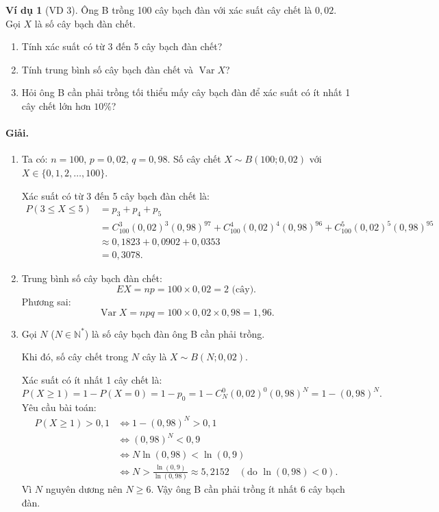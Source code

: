 \documentclass[12pt,a4paper]{article}
\theoremstyle{definition}
\newtheorem{vidu}{Ví dụ}[section]
\begin{document}
\begin{vidu}[VD 3]
Ông B trồng 100 cây bạch đàn với xác suất cây chết là $0{,}02$. Gọi $X$ là số cây bạch đàn chết.
\begin{enumerate}[label=\arabic*)]
    \item Tính xác suất có từ 3 đến 5 cây bạch đàn chết?
    \item Tính trung bình số cây bạch đàn chết và $\operatorname{Var} X$?
    \item Hỏi ông B cần phải trồng tối thiểu mấy cây bạch đàn để xác suất có ít nhất 1 cây chết lớn hơn $10\%$?
\end{enumerate}

\paragraph{Giải.}
\begin{enumerate}[label=\arabic*)]
    \item Ta có: $n = 100$, $p = 0{,}02$, $q = 0{,}98$. Số cây chết $X \sim B(100; 0{,}02)$ với $X \in \{0, 1, 2, \dots, 100\}$.
    
    Xác suất có từ 3 đến 5 cây bạch đàn chết là:
    \begin{align*}
    P(3 \le X \le 5) &= p_3 + p_4 + p_5 \\
    &= C_{100}^3 (0{,}02)^3 (0{,}98)^{97} + C_{100}^4 (0{,}02)^4 (0{,}98)^{96} + C_{100}^5 (0{,}02)^5 (0{,}98)^{95} \\
    &\approx 0{,}1823 + 0{,}0902 + 0{,}0353 \\
    &= 0{,}3078.
    \end{align*}

    \item Trung bình số cây bạch đàn chết:
    \[
    EX = np = 100 \times 0{,}02 = 2 \text{ (cây)}.
    \]
    Phương sai:
    \[
    \operatorname{Var} X = npq = 100 \times 0{,}02 \times 0{,}98 = 1{,}96.
    \]

    \item Gọi $N$ ($N \in \mathbb{N}^*$) là số cây bạch đàn ông B cần phải trồng.
    
    Khi đó, số cây chết trong $N$ cây là $X \sim B(N; 0{,}02)$.
    
    Xác suất có ít nhất 1 cây chết là:
    \[
    P(X \ge 1) = 1 - P(X = 0) = 1 - p_0 = 1 - C_N^0 (0{,}02)^0 (0{,}98)^N = 1 - (0{,}98)^N.
    \]
    Yêu cầu bài toán:
    \begin{align*}
    P(X \ge 1) > 0{,}1 &\iff 1 - (0{,}98)^N > 0{,}1 \\
    &\iff (0{,}98)^N < 0{,}9 \\
    &\iff N \ln(0{,}98) < \ln(0{,}9) \\
    &\iff N > \frac{\ln(0{,}9)}{\ln(0{,}98)} \approx 5{,}2152 \quad (\text{do } \ln(0{,}98) < 0).
    \end{align*}
    Vì $N$ nguyên dương nên $N \ge 6$. Vậy ông B cần phải trồng ít nhất 6 cây bạch đàn.
\end{enumerate}
\end{vidu}
\end{document}
